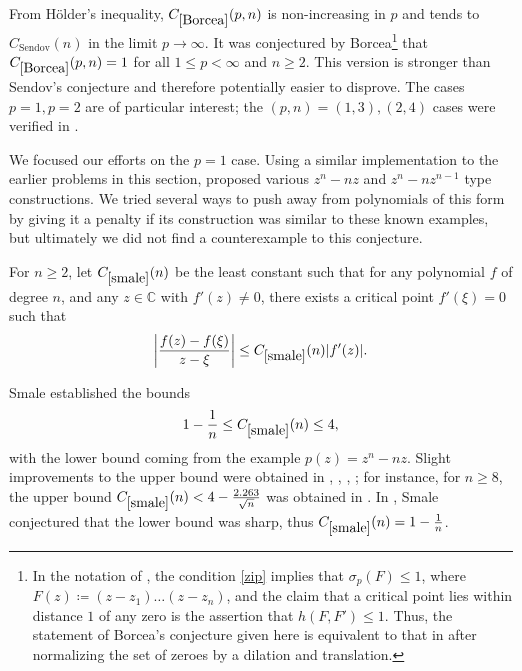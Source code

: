 From H\"older's inequality, $C_{\ref{Borcea}}(p,n)$ is non-increasing in $p$ and tends to $C_{\mathrm{Sendov}}(n)$ in the limit $p \to \infty$.  It was conjectured by Borcea\footnote{In the notation of \cite{khavinson}, the condition \eqref{zip} implies that $\sigma_p(F) \leq 1$, where $F(z) \coloneqq (z-z_1) \dots (z-z_n)$, and the claim that a critical point lies within distance $1$ of any zero is the assertion that $h(F,F') \leq 1$.  Thus, the statement of Borcea's conjecture given here is equivalent to that in \cite[Conjecture 1]{khavinson} after normalizing the set of zeroes by a dilation and translation.}
\cite[Conjecture 1]{khavinson} that $C_{\ref{Borcea}}(p,n)=1$ for all $1 \leq p < \infty$ and $n \geq 2$. This version is stronger than Sendov's conjecture and therefore potentially easier to disprove.  The cases $p=1, p=2$ are of particular interest; the $(p,n) = (1,3), (2,4)$ cases were verified in \cite{khavinson}.

We focused our efforts on the $p=1$ case. Using a similar implementation to the earlier problems in this section, \AlphaEvolve proposed various $z^n-nz$ and $z^n-nz^{n-1}$ type constructions. We tried several ways to push \AlphaEvolve away from polynomials of this form by giving it a penalty if its construction was similar to these known examples, but ultimately we did not find a counterexample to this conjecture.


\renewcommand{\problemURL}{https://google-deepmind.github.io/alphaevolve_repository_of_problems/problems/23.html}

\begin{problem}\label{smale}
For $n \geq 2$, let $C_{\ref{smale}}(n)$ be the least constant such that for any polynomial $f$ of degree $n$, and any $z \in \mathbb{C}$ with $f'(z) \neq 0$, there exists a critical point $f'(\xi)=0$ such that
$$ \left|\frac{f(z)-f(\xi)}{z-\xi}\right| \leq C_{\ref{smale}}(n) |f'(z)|.$$
\end{problem}


Smale \cite{smale} established the bounds
$$ 1 - \frac{1}{n} \leq C_{\ref{smale}}(n) \leq 4,$$
with the lower bound coming from the example $p(z) = z^n-nz$.  Slight improvements to the upper bound were obtained in \cite{beardon2002}, \cite{conte2007}, \cite{fujikawa2006}, \cite{crane}; for instance, for $n \geq 8$, the upper bound
$C_{\ref{smale}}(n) <  4 - \frac{2.263}{\sqrt{n}}$ was obtained in \cite{crane}.  In \cite[Problem 1E]{smale}, Smale conjectured that the lower bound was sharp, thus $C_{\ref{smale}}(n) = 1 - \frac{1}{n}$.

